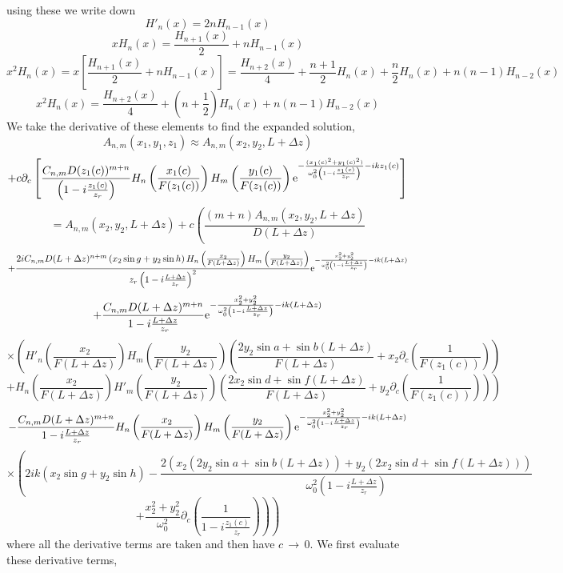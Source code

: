 \documentclass[11pt]{amsart}
\makeatletter
\newcommand{\e}{{\rm e}}				%
\newcommand{\0}{\varnothing}		%
\DeclareMathOperator*{\goes}{\, \longrightarrow \,}		%
\newcommand{\apr}{\approx}		%
\newcommand{\pp}{\partial}					%
\newcommand{\1}{!}
\newcommand{\2}{@}
\newcommand{\3}{\#}
\newcommand{\4}{\$}
\newcommand{\5}{\%}
\newcommand{\6}{$^\wedge$}
\newcommand{\7}{\&}
\newcommand{\8}{*}
\newcommand{\9}{(}
\makeatother
\begin{document}
using these we write down
\[
H'_n(x) = 2nH_{n-1}(x)
\]
\[
xH_n(x) = \frac{H_{n+1}(x)}{2}+nH_{n-1}(x)
\]
\[
x^2H_n(x) = x\left[\frac{H_{n+1}(x)}{2}+nH_{n-1}(x)\right] = \frac{H_{n+2}(x)}{4}+\frac{n+1}{2}H_n(x)+\frac{n}{2}H_n(x)+n(n-1)H_{n-2}(x)
\]
\[
x^2H_n(x) = \frac{H_{n+2}(x)}{4}+\left(n+\frac{1}{2}\right)H_n(x)+n(n-1)H_{n-2}(x)
\]
We take the derivative of these elements to find the expanded solution,
\[
A_{n,m}(x_1,y_1,z_1) \apr A_{n,m}(x_2,y_2,L+\Delta z)\]\[+c\pp_c\left[ \frac{C_{n,m}D(z_1(c))^{m+n}}{\left(1-i\frac{z_1(c)}{z_r}\right)}H_n\left(\frac{x_1(c)}{F(z_1(c))}\right)H_m\left(\frac{y_1(c)}{F(z_1(c))}\right)\e^{-\frac{(x_1(c)^2+y_1(c)^2)}{\omega_0^2\left(1-i\frac{z_1(c)}{z_r}\right)}-ikz_1(c)}\right]
\]
\[
=A_{n,m}(x_2,y_2,L+\Delta z)+c\left(\frac{(m+n)A_{n,m}(x_2,y_2,L+\Delta z)}{D(L+\Delta z)}\right.
\]
\[\left.+\frac{2iC_{n,m}D(L+\Delta z)^{n+m}\left(x_2\sin g+y_2\sin h\right)H_n\left(\frac{x_2}{F(L+\Delta z)}\right)H_m\left(\frac{y_2}{F\left(L+\Delta z\right)}\right)}{z_r\left(1-i\frac{L+\Delta z}{z_r}\right)^2}\e^{-\frac{x_2^2+y_2^2}{\omega_0^2\left(1-i\frac{L+\Delta z}{z_r}\right)}-ik\left(L+\Delta z\right)}\right.
\]
\[
\left.+\frac{C_{n,m}D(L+\Delta z)^{m+n}}{1-i\frac{L+\Delta z}{z_r}}\e^{-\frac{x_2^2+y_2^2}{\omega_0^2\left(1-i\frac{L+\Delta z}{z_r}\right)}-ik\left(L+\Delta z\right)}\right.
\]
\[\left.\times\left(H'_n\left(\frac{x_2}{F\left(L+\Delta z\right)}\right)H_m\left(\frac{y_2}{F\left(L+\Delta z\right)}\right)\left(\frac{2y_2\sin a+\sin b\left(L+\Delta z\right)}{F\left(L+\Delta z\right)}+x_2\pp_c\left(\frac{1}{F(z_1(c))}\right)\right)\right.\right.
\]
\[
\left.\left.+H_n\left(\frac{x_2}{F\left(L+\Delta z\right)}\right)H'_m\left(\frac{y_2}{F\left(L+\Delta z\right)}\right)\left(\frac{2x_2\sin d+\sin f\left(L+\Delta z\right)}{F\left(L+\Delta z\right)}+y_2\pp_c\left(\frac{1}{F(z_1(c))}\right)\right)\right)\right.
\]
\[
\left.-\frac{C_{n,m}D(L+\Delta z)^{m+n}}{1-i\frac{L+\Delta z}{z_r}}H_n\left(\frac{x_2}{F(L+\Delta z)}\right)H_m\left(\frac{y_2}{F(L+\Delta z)}\right)\e^{-\frac{x_2^2+y_2^2}{\omega_0^2\left(1-i\frac{L+\Delta z}{z_r}\right)}-ik\left(L+\Delta z\right)}\right.
\]
\[
\left.\times\left(2ik\left(x_2\sin g+y_2\sin h\right)-\frac{2\left(x_2\left(2y_2\sin a+\sin b\left(L+\Delta z\right)\right)+y_2\left(2x_2\sin d+\sin f\left(L+\Delta z\right)\right)\right)}{\omega_0^2\left(1-i\frac{L+\Delta z}{z_r}\right)}\right.\right.
\]
\[
\left.\left.+\frac{x_2^2+y_2^2}{\omega_0^2}\pp_c\left(\frac{1}{1-i\frac{z_1(c)}{z_r}}\right)\right)\right)
\]
where all the derivative terms are taken and then have $c\goes 0$. We first evaluate these derivative terms,
\end{document}
